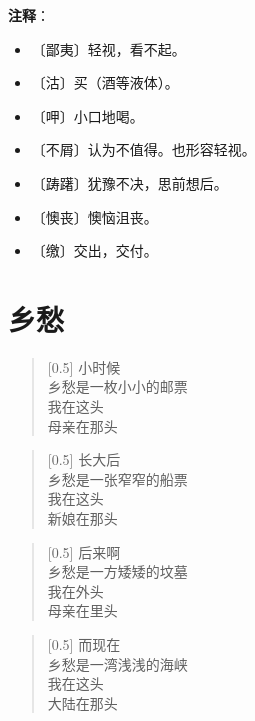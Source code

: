 \documentclass[12pt,UTF-8,openany]{ctexbook}
\begin{document}
\newpage

\textbf{注释}：

\vspace{-1em}

\begin{itemize}
    \setlength\itemsep{-0.2em}
    \item 〔鄙夷〕轻视，看不起。
    \item 〔沽〕买（酒等液体）。
    \item 〔呷〕小口地喝。
    \item 〔不屑〕认为不值得。也形容轻视。
    \item 〔踌躇〕犹豫不决，思前想后。
    \item 〔懊丧〕懊恼沮丧。
    \item 〔缴〕交出，交付。
\end{itemize}

\chapter{乡愁}

\begin{large}
    
    \begin{verse}[0.5\linewidth]
        小时候 \\
        乡愁是一枚小小的邮票 \\
        我在这头 \\
        母亲在那头
    \end{verse}
    
    
    \begin{verse}[0.5\linewidth]
        长大后 \\
        乡愁是一张窄窄的船票 \\
        我在这头 \\
        新娘在那头
    \end{verse}
    
    
    \begin{verse}[0.5\linewidth]
        后来啊 \\
        乡愁是一方矮矮的坟墓 \\
        我在外头 \\
        母亲在里头
    \end{verse}
    
    
    \begin{verse}[0.5\linewidth]
        而现在 \\
        乡愁是一湾浅浅的海峡 \\
        我在这头 \\
        大陆在那头
    \end{verse}
    
\end{large}
\end{document}
